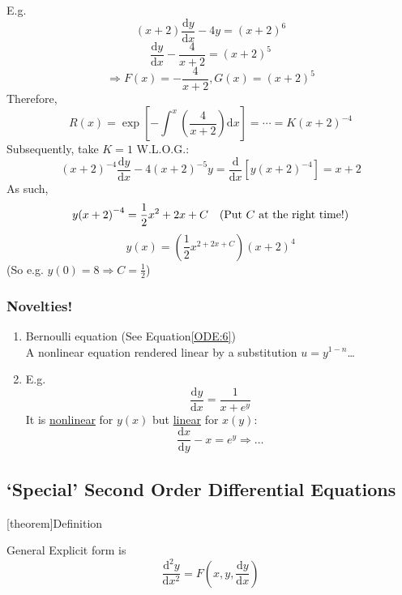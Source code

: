 \documentclass[12pt]{report}
\theoremstyle{definition}
\begin{document}
\begin{enumerate}[label = (\alph*)]
E.g. \[
    (x+2) \frac{\mathrm{d}y}{\mathrm{d}x} - 4y = {(x+2)}^{6}
\]\[
\frac{\mathrm{d}y}{\mathrm{d}x} - \frac{4}{x+2} = {(x + 2)}^{5}
\]\[
\Rightarrow F(x) = -\frac{4}{x+2}, G(x) = {(x + 2)}^{5}
\]Therefore,\[
R(x) = \exp{\left[-\int_{}^{x} \left(\frac{4}{x+2}\right) \mathrm{d}x\right] }
= \cdots = K{(x+2)}^{-4}
\]Subsequently, take $K = 1$ W.L.O.G.:\[
{(x+2)}^{-4}\frac{\mathrm{d}y}{\mathrm{d}x} - 4{(x+2)}^{-5} y
= \frac{\mathrm{d}}{\mathrm{d}x} \left[y{(x+2)}^{-4}\right] = x + 2
\]As such,\[
y{(x + 2)}^{-4} = \frac{1}{2}x^{2} + 2x + C \quad \textnormal{(Put $C$ at the right time!)}
\]\[
y(x) = \left(\frac{1}{2}x^{2 + 2x + C}\right) {(x + 2)}^{4}
\]
(So e.g. $y(0) = 8 \Rightarrow C = \frac{1}{2}$)
\end{enumerate}

\subsubsection{Novelties!}

\begin{enumerate}[label = (\roman*)]
    \item Bernoulli equation (See Equation\eqref{ODE:6})
        \\A nonlinear equation rendered linear by a substitution $u = y^{1-n}$\ldots

    \item E.g.\[
        \frac{\mathrm{d}y}{\mathrm{d}x} = \frac{1}{x + e^{y}}
    \]It is \underline{nonlinear} for $y(x)$ but \underline{linear}  for $x(y)$:\[
        \frac{\mathrm{d}x}{\mathrm{d}y} - x = e^{y} \Rightarrow \ldots
    \]
\end{enumerate}

\subsection{`Special' Second Order Differential Equations}

[theorem]{Definition}
\begin{General 2nd order ODE}
    General Explicit form is\[
        \frac{\mathrm{d}^{2}y}{\mathrm{d}x^{2}} = F\left(x,y,\frac{\mathrm{d}y}{\mathrm{d}x} \right) 
    \]
\end{General 2nd order ODE}
\end{document}
